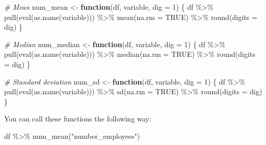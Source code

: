 \documentclass[
]{book}
\newenvironment{Shaded}{\begin{snugshade}}{\end{snugshade}}
\newcommand{\AttributeTok}[1]{\textcolor[rgb]{0.77,0.63,0.00}{#1}}
\newcommand{\CommentTok}[1]{\textcolor[rgb]{0.56,0.35,0.01}{\textit{#1}}}
\newcommand{\ConstantTok}[1]{\textcolor[rgb]{0.00,0.00,0.00}{#1}}
\newcommand{\ControlFlowTok}[1]{\textcolor[rgb]{0.13,0.29,0.53}{\textbf{#1}}}
\newcommand{\DecValTok}[1]{\textcolor[rgb]{0.00,0.00,0.81}{#1}}
\newcommand{\FunctionTok}[1]{\textcolor[rgb]{0.00,0.00,0.00}{#1}}
\newcommand{\NormalTok}[1]{#1}
\newcommand{\OtherTok}[1]{\textcolor[rgb]{0.56,0.35,0.01}{#1}}
\newcommand{\SpecialCharTok}[1]{\textcolor[rgb]{0.00,0.00,0.00}{#1}}
\newcommand{\StringTok}[1]{\textcolor[rgb]{0.31,0.60,0.02}{#1}}
\begin{document}
\begin{Shaded}
\begin{Highlighting}[]
\CommentTok{\# Mean}
\NormalTok{num\_mean }\OtherTok{\textless{}{-}} \ControlFlowTok{function}\NormalTok{(df, variable, }\AttributeTok{dig =} \DecValTok{1}\NormalTok{) \{}
\NormalTok{  df }\SpecialCharTok{\%\textgreater{}\%} 
    \FunctionTok{pull}\NormalTok{(}\FunctionTok{eval}\NormalTok{(}\FunctionTok{as.name}\NormalTok{(variable))) }\SpecialCharTok{\%\textgreater{}\%} 
    \FunctionTok{mean}\NormalTok{(}\AttributeTok{na.rm =} \ConstantTok{TRUE}\NormalTok{) }\SpecialCharTok{\%\textgreater{}\%} 
    \FunctionTok{round}\NormalTok{(}\AttributeTok{digits =}\NormalTok{ dig)}
\NormalTok{\}}

\CommentTok{\# Median}
\NormalTok{num\_median }\OtherTok{\textless{}{-}} \ControlFlowTok{function}\NormalTok{(df, variable, }\AttributeTok{dig =} \DecValTok{1}\NormalTok{) \{}
\NormalTok{  df }\SpecialCharTok{\%\textgreater{}\%} 
    \FunctionTok{pull}\NormalTok{(}\FunctionTok{eval}\NormalTok{(}\FunctionTok{as.name}\NormalTok{(variable))) }\SpecialCharTok{\%\textgreater{}\%} 
    \FunctionTok{median}\NormalTok{(}\AttributeTok{na.rm =} \ConstantTok{TRUE}\NormalTok{) }\SpecialCharTok{\%\textgreater{}\%} 
    \FunctionTok{round}\NormalTok{(}\AttributeTok{digits =}\NormalTok{ dig)}
\NormalTok{\}}

\CommentTok{\# Standard deviation}
\NormalTok{num\_sd }\OtherTok{\textless{}{-}} \ControlFlowTok{function}\NormalTok{(df, variable, }\AttributeTok{dig =} \DecValTok{1}\NormalTok{) \{}
\NormalTok{  df }\SpecialCharTok{\%\textgreater{}\%} 
    \FunctionTok{pull}\NormalTok{(}\FunctionTok{eval}\NormalTok{(}\FunctionTok{as.name}\NormalTok{(variable))) }\SpecialCharTok{\%\textgreater{}\%} 
    \FunctionTok{sd}\NormalTok{(}\AttributeTok{na.rm =} \ConstantTok{TRUE}\NormalTok{) }\SpecialCharTok{\%\textgreater{}\%} 
    \FunctionTok{round}\NormalTok{(}\AttributeTok{digits =}\NormalTok{ dig)}
\NormalTok{\}}
\end{Highlighting}
\end{Shaded}

You can call these functions the following way:

\begin{Shaded}
\begin{Highlighting}[]
\NormalTok{df }\SpecialCharTok{\%\textgreater{}\%} \FunctionTok{num\_mean}\NormalTok{(}\StringTok{"number\_employees"}\NormalTok{)}
\end{Highlighting}
\end{Shaded}
\end{document}
